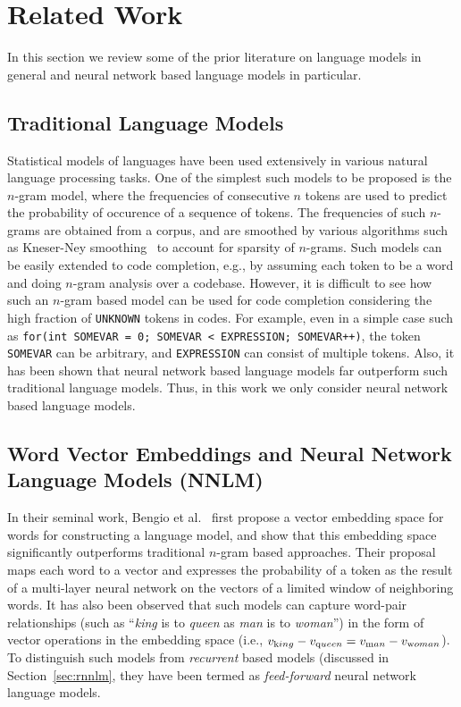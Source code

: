 \section{Related Work}
\label{sec:related}

In this section we review some of the prior literature on language models in
general and neural network based language models in particular.

\subsection{Traditional Language Models}
Statistical models of languages have been used extensively in various natural
language processing tasks. One of the simplest such models to be proposed is the
$n$-gram model, where the frequencies of consecutive $n$ tokens are used to
predict the probability of occurence of a sequence of tokens. The frequencies of
such $n$-grams are obtained from a corpus, and are smoothed by various
algorithms such as Kneser-Ney smoothing~\cite{ref:kneser-ney} to account for
sparsity of $n$-grams. Such models can be easily extended to code completion,
e.g., by assuming each token to be a word and doing $n$-gram analysis over a
codebase. However, it is difficult to see how such an $n$-gram based model can be
used for code completion considering the high fraction of {\tt UNKNOWN} tokens
in codes. For example, even in a simple case such as {\tt for(int SOMEVAR = 0;
SOMEVAR < EXPRESSION; SOMEVAR++)}, the token {\tt SOMEVAR} can be arbitrary, and
{\tt EXPRESSION} can consist of multiple tokens. Also, it has been shown that
neural network based language models far outperform such traditional language
models. Thus, in this work we only consider neural network based language
models.

\subsection{Word Vector Embeddings and Neural Network Language Models (NNLM)}
In their seminal work, Bengio et al.~\cite{ref:embedding} first propose a
vector embedding space for words for constructing a language model, and show
that this embedding space significantly outperforms traditional $n$-gram based
approaches. Their proposal maps each word to a vector and expresses the
probability of a token as the result of a multi-layer neural network on the
vectors of a limited window of neighboring words. It has also been observed
\cite{ref:regularities} that such models can capture word-pair relationships
(such as ``{\em king} is to {\em queen} as {\em man} is to {\em woman}'') in
the form of vector operations in the embedding space (i.e., $v_{\text king} -
v_{\text queen} = v_{\text man} - v_{\text woman}$). To distinguish such models
from {\it recurrent} based models (discussed in Section~\ref{sec:rnnlm}, they
have been termed as {\it feed-forward} neural network language models.

